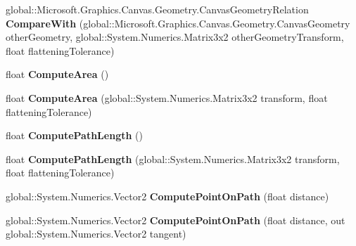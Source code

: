 \begin{DoxyCompactItemize}
global\+::\+Microsoft.\+Graphics.\+Canvas.\+Geometry.\+Canvas\+Geometry\+Relation {\bfseries Compare\+With} (global\+::\+Microsoft.\+Graphics.\+Canvas.\+Geometry.\+Canvas\+Geometry other\+Geometry, global\+::\+System.\+Numerics.\+Matrix3x2 other\+Geometry\+Transform, float flattening\+Tolerance)
\item 
\mbox{\label{class_microsoft_1_1_graphics_1_1_canvas_1_1_geometry_1_1_canvas_geometry_aa08eda160516a30cec6d6df2eff63201}} 
float {\bfseries Compute\+Area} ()
\item 
\mbox{\label{class_microsoft_1_1_graphics_1_1_canvas_1_1_geometry_1_1_canvas_geometry_a691883046354446e27838e64d21e99bb}} 
float {\bfseries Compute\+Area} (global\+::\+System.\+Numerics.\+Matrix3x2 transform, float flattening\+Tolerance)
\item 
\mbox{\label{class_microsoft_1_1_graphics_1_1_canvas_1_1_geometry_1_1_canvas_geometry_ac795f5b565a905b8bfbd67e69c327ceb}} 
float {\bfseries Compute\+Path\+Length} ()
\item 
\mbox{\label{class_microsoft_1_1_graphics_1_1_canvas_1_1_geometry_1_1_canvas_geometry_a5ddd0bb4b6fa3da6b55d5cdbfdbea574}} 
float {\bfseries Compute\+Path\+Length} (global\+::\+System.\+Numerics.\+Matrix3x2 transform, float flattening\+Tolerance)
\item 
\mbox{\label{class_microsoft_1_1_graphics_1_1_canvas_1_1_geometry_1_1_canvas_geometry_a5bc13e03dbf00e5ca5deef3ddcc406c8}} 
global\+::\+System.\+Numerics.\+Vector2 {\bfseries Compute\+Point\+On\+Path} (float distance)
\item 
\mbox{\label{class_microsoft_1_1_graphics_1_1_canvas_1_1_geometry_1_1_canvas_geometry_a59cbc03d8d69b1b5eb3ac79a8e38ec04}} 
global\+::\+System.\+Numerics.\+Vector2 {\bfseries Compute\+Point\+On\+Path} (float distance, out global\+::\+System.\+Numerics.\+Vector2 tangent)
\item 

\end{DoxyCompactItemize}
